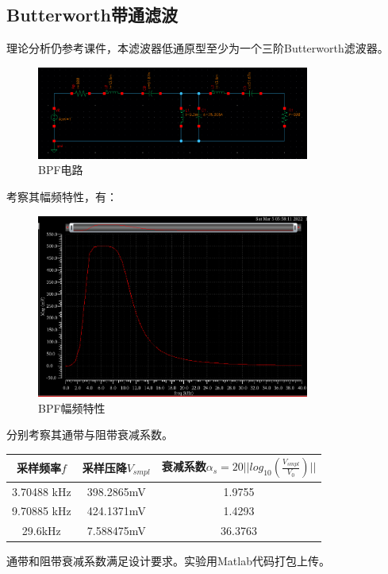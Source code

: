 \documentclass[12pt, a4paper]{article}
\begin{document}
    \subsection{Butterworth带通滤波}
    理论分析仍参考课件，本滤波器低通原型至少为一个三阶Butterworth滤波器。\par
    \begin{figure}[H]
    	\centering
    	\includegraphics[width = 0.8\textwidth]{ButterworthBPF-circuit}
    	\caption{BPF电路}
    \end{figure}
    考察其幅频特性，有：
    \begin{figure}[H]
    	\centering
    	\includegraphics[width = 0.8\textwidth]{ButterworthBPF-plot}
    	\caption{BPF幅频特性}
    \end{figure}\par
    分别考察其通带与阻带衰减系数。
    \begin{center}
    	\begin{tabular}{| c | c | c | }
    		\hline
    		采样频率$f$ &  采样压降$V_{smpl}$ & 衰减系数$\alpha_s = 20 || log_{10}(\frac{V_{smpl}}{V_0}) ||$  \\
    		\hline
    		3.70488 kHz & 398.2865mV & 1.9755 \\
    		\hline
    		9.70885 kHz & 424.1371mV & 1.4293 \\
    		\hline
    		29.6kHz & 7.588475mV & 36.3763 \\
    		\hline
    	\end{tabular}
    \end{center} \par
     通带和阻带衰减系数满足设计要求。实验用Matlab代码打包上传。
\end{document}
